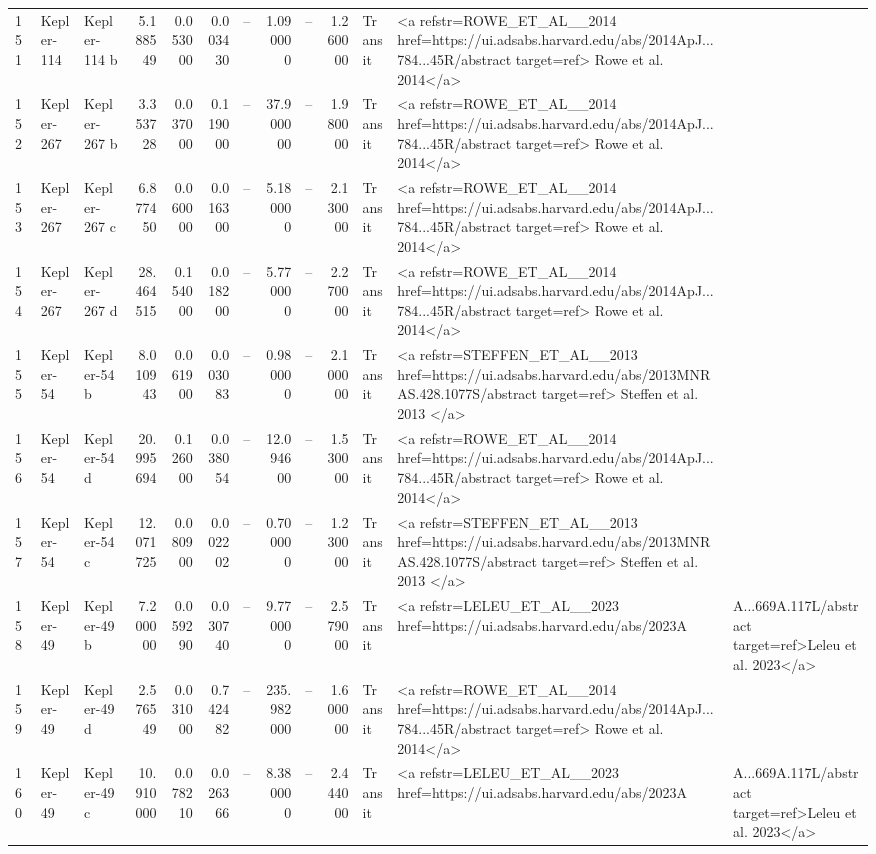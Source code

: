 \begin{tabular}{lllrrrrrrrll}
151 & Kepler-114 & Kepler-114 b & 5.188549 & 0.053000 & 0.003430 & -- & 1.090000 & -- & 1.260000 & Transit & <a refstr=ROWE_ET_AL__2014 href=https://ui.adsabs.harvard.edu/abs/2014ApJ...784...45R/abstract target=ref> Rowe et al. 2014</a> \\
152 & Kepler-267 & Kepler-267 b & 3.353728 & 0.037000 & 0.119000 & -- & 37.900000 & -- & 1.980000 & Transit & <a refstr=ROWE_ET_AL__2014 href=https://ui.adsabs.harvard.edu/abs/2014ApJ...784...45R/abstract target=ref> Rowe et al. 2014</a> \\
153 & Kepler-267 & Kepler-267 c & 6.877450 & 0.060000 & 0.016300 & -- & 5.180000 & -- & 2.130000 & Transit & <a refstr=ROWE_ET_AL__2014 href=https://ui.adsabs.harvard.edu/abs/2014ApJ...784...45R/abstract target=ref> Rowe et al. 2014</a> \\
154 & Kepler-267 & Kepler-267 d & 28.464515 & 0.154000 & 0.018200 & -- & 5.770000 & -- & 2.270000 & Transit & <a refstr=ROWE_ET_AL__2014 href=https://ui.adsabs.harvard.edu/abs/2014ApJ...784...45R/abstract target=ref> Rowe et al. 2014</a> \\
155 & Kepler-54 & Kepler-54 b & 8.010943 & 0.061900 & 0.003083 & -- & 0.980000 & -- & 2.100000 & Transit & <a refstr=STEFFEN_ET_AL__2013 href=https://ui.adsabs.harvard.edu/abs/2013MNRAS.428.1077S/abstract target=ref> Steffen et al. 2013 </a> \\
156 & Kepler-54 & Kepler-54 d & 20.995694 & 0.126000 & 0.038054 & -- & 12.094600 & -- & 1.530000 & Transit & <a refstr=ROWE_ET_AL__2014 href=https://ui.adsabs.harvard.edu/abs/2014ApJ...784...45R/abstract target=ref> Rowe et al. 2014</a> \\
157 & Kepler-54 & Kepler-54 c & 12.071725 & 0.080900 & 0.002202 & -- & 0.700000 & -- & 1.230000 & Transit & <a refstr=STEFFEN_ET_AL__2013 href=https://ui.adsabs.harvard.edu/abs/2013MNRAS.428.1077S/abstract target=ref> Steffen et al. 2013 </a> \\
158 & Kepler-49 & Kepler-49 b & 7.200000 & 0.059290 & 0.030740 & -- & 9.770000 & -- & 2.579000 & Transit & <a refstr=LELEU_ET_AL__2023 href=https://ui.adsabs.harvard.edu/abs/2023A&A...669A.117L/abstract target=ref>Leleu et al. 2023</a> \\
159 & Kepler-49 & Kepler-49 d & 2.576549 & 0.031000 & 0.742482 & -- & 235.982000 & -- & 1.600000 & Transit & <a refstr=ROWE_ET_AL__2014 href=https://ui.adsabs.harvard.edu/abs/2014ApJ...784...45R/abstract target=ref> Rowe et al. 2014</a> \\
160 & Kepler-49 & Kepler-49 c & 10.910000 & 0.078210 & 0.026366 & -- & 8.380000 & -- & 2.444000 & Transit & <a refstr=LELEU_ET_AL__2023 href=https://ui.adsabs.harvard.edu/abs/2023A&A...669A.117L/abstract target=ref>Leleu et al. 2023</a> \\

\end{tabular}
